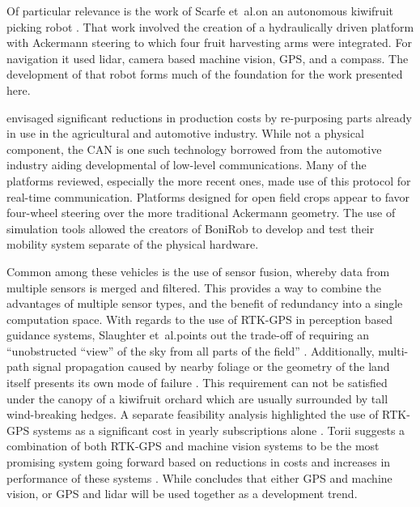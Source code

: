 \documentclass[preprint,authoryear,12pt]{elsarticle}
\begin{document}
        Of particular relevance is the work of Scarfe et~al.\@ on an autonomous kiwifruit picking robot \citep{scarfe2009, Scarfe2012}.
        That work involved the creation of a hydraulically driven platform with Ackermann steering to which four fruit harvesting arms were integrated.
        For navigation it used lidar, camera based machine vision, GPS, and a compass.
        The development of that robot forms much of the foundation for the work presented here.

        \cite{Blackmore2007} envisaged significant reductions in production costs by re-purposing parts already in use in the agricultural and automotive industry.
        While not a physical component, the CAN is one such technology borrowed from the automotive industry aiding developmental of low-level communications.
        Many of the platforms reviewed, especially the more recent ones, made use of this protocol for real-time communication.
        Platforms designed for open field crops appear to favor four-wheel steering over the more traditional Ackermann geometry.
        The use of simulation tools allowed the creators of BoniRob to develop and test their mobility system separate of the physical hardware.

        Common among these vehicles is the use of sensor fusion, whereby data from multiple sensors is merged and filtered.
        This provides a way to combine the advantages of multiple sensor types, and the benefit of redundancy  into a single computation space.
        With regards to the use of RTK-GPS in perception based guidance systems, Slaughter et~al.\@ points out the trade-off of requiring an ``unobstructed ``view'' of the sky from all parts of the field'' \citep{Slaughter2008}.
        Additionally, multi-path signal propagation caused by nearby foliage or the geometry of the land itself presents its own mode of failure \citep{Durrant-Whyte2005}.
        This requirement can not be satisfied under the canopy of a kiwifruit orchard which are usually surrounded by tall wind-breaking hedges.
        A separate feasibility analysis highlighted the use of RTK-GPS systems as a significant cost in yearly subscriptions alone \citep{Pedersen2006}.
        Torii suggests a combination of both RTK-GPS and machine vision systems to be the most promising system going forward based on reductions in costs and increases in performance of these systems \cite{Torii2000}.
        While \cite{Li2009} concludes that either GPS and machine vision, or GPS and lidar will be used together as a development trend.
\end{document}
